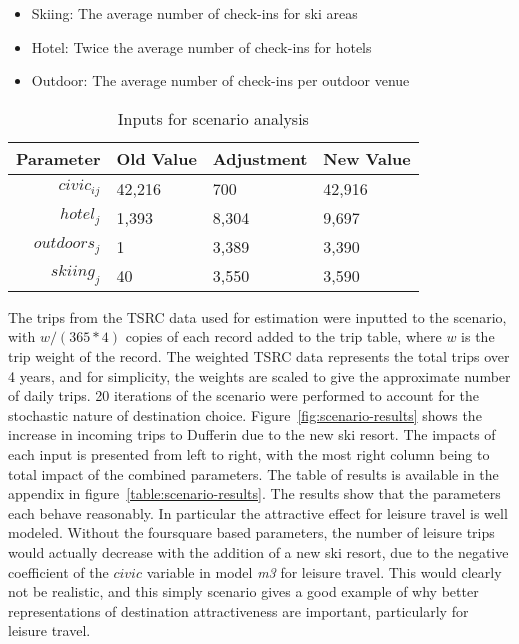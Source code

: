\begin{minipage}{\textwidth}
\begin{itemize}
\item Skiing: The average number of check-ins for ski areas
\item Hotel: Twice the average number of check-ins for hotels
\item Outdoor: The average number of check-ins per outdoor venue
\end{itemize}
\end{minipage}

\begin{table}[H]
\centering
\caption{Inputs for scenario analysis}
\label{table:scenario-inputs}
\begin{tabular}{@{}rlll@{}}
  \toprule
 Parameter & Old Value & Adjustment & New Value  \\ \midrule
  $civic_{ij}$ & 42,216 & 700 & 42,916  \\ 
  $hotel_j$ & 1,393  & 8,304 & 9,697  \\ 
  $outdoors_j$  & 1 & 3,389 & 3,390  \\ 
  $skiing_j$ & 40  & 3,550 & 3,590 \\ 
   \bottomrule
\end{tabular}
\end{table}

The trips from the TSRC data used for estimation were inputted to the scenario, with $w/(365*4)$ copies of each record added to the trip table, where $w$ is the trip weight of the record. The weighted TSRC data represents the total trips over 4 years, and for simplicity, the weights are scaled to give the approximate number of daily trips. 20 iterations of the scenario were performed to account for the stochastic nature of destination choice. Figure~\ref{fig:scenario-results} shows the increase in incoming trips to Dufferin due to the new ski resort. The impacts of each input is presented from left to right, with the most right column being to total impact of the combined parameters. The table of results is available in the appendix in figure~\ref{table:scenario-results}. The results show that the parameters each behave reasonably. In particular the attractive effect for leisure travel is well modeled. Without the foursquare based parameters, the number of leisure trips would actually decrease with the addition of a new ski resort, due to the negative coefficient of the $civic$ variable in model \textit{m3} for leisure travel. This would clearly not be realistic, and this simply scenario gives a good example of why better representations of destination attractiveness are important, particularly for leisure travel.

